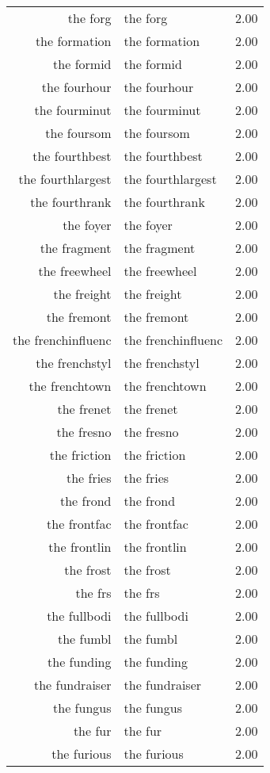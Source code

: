 \begin{table}[ht]
\begin{tabular}{rlr}
  the forg & the forg & 2.00 \\ 
  the formation & the formation & 2.00 \\ 
  the formid & the formid & 2.00 \\ 
  the fourhour & the fourhour & 2.00 \\ 
  the fourminut & the fourminut & 2.00 \\ 
  the foursom & the foursom & 2.00 \\ 
  the fourthbest & the fourthbest & 2.00 \\ 
  the fourthlargest & the fourthlargest & 2.00 \\ 
  the fourthrank & the fourthrank & 2.00 \\ 
  the foyer & the foyer & 2.00 \\ 
  the fragment & the fragment & 2.00 \\ 
  the freewheel & the freewheel & 2.00 \\ 
  the freight & the freight & 2.00 \\ 
  the fremont & the fremont & 2.00 \\ 
  the frenchinfluenc & the frenchinfluenc & 2.00 \\ 
  the frenchstyl & the frenchstyl & 2.00 \\ 
  the frenchtown & the frenchtown & 2.00 \\ 
  the frenet & the frenet & 2.00 \\ 
  the fresno & the fresno & 2.00 \\ 
  the friction & the friction & 2.00 \\ 
  the fries & the fries & 2.00 \\ 
  the frond & the frond & 2.00 \\ 
  the frontfac & the frontfac & 2.00 \\ 
  the frontlin & the frontlin & 2.00 \\ 
  the frost & the frost & 2.00 \\ 
  the frs & the frs & 2.00 \\ 
  the fullbodi & the fullbodi & 2.00 \\ 
  the fumbl & the fumbl & 2.00 \\ 
  the funding & the funding & 2.00 \\ 
  the fundraiser & the fundraiser & 2.00 \\ 
  the fungus & the fungus & 2.00 \\ 
  the fur & the fur & 2.00 \\ 
  the furious & the furious & 2.00 \\ 

\end{tabular}
\end{table}
